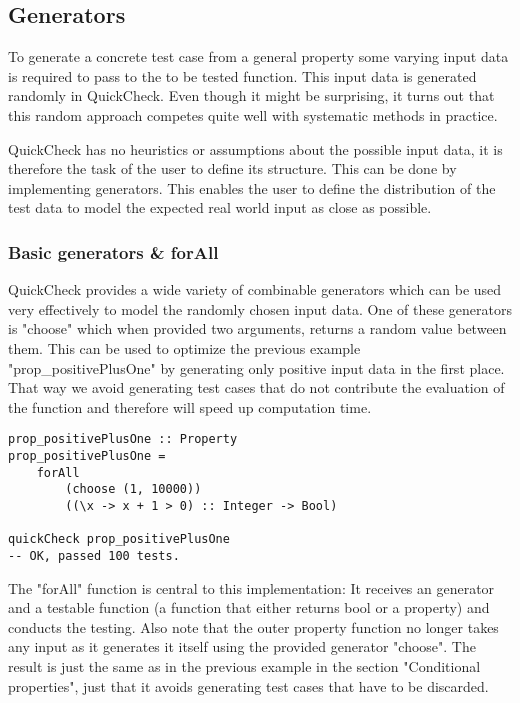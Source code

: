 \documentclass[a4paper, 12pt]{article} %
\begin{document}
\subsection{Generators}

To generate a concrete test case from a general property some varying input data is required to pass to the to be tested function. This input data is generated randomly in QuickCheck. Even though it might be surprising, it turns out that this random approach competes quite well with systematic methods in practice. \cite{Claessen2000}

QuickCheck has no heuristics or assumptions about the possible input data, it is therefore the task of the user to define its structure. This can be done by implementing generators. This enables the user to define the distribution of the test data to model the expected real world input as close as possible.


\subsubsection{Basic generators \& forAll}

QuickCheck provides a wide variety of combinable generators which can be used very effectively to model the randomly chosen input data. One of these generators is "choose" which when provided two arguments, returns a random value between them. This can be used to optimize the previous example "prop\_positivePlusOne" by generating only positive input data in the first place. That way we avoid generating test cases that do not contribute the evaluation of the function and therefore will speed up computation time. 

\begin{verbatim}
prop_positivePlusOne :: Property
prop_positivePlusOne = 
    forAll
        (choose (1, 10000))
        ((\x -> x + 1 > 0) :: Integer -> Bool)

quickCheck prop_positivePlusOne
-- OK, passed 100 tests.
\end{verbatim}

The "forAll" function is central to this implementation: It receives an generator and a testable function (a function that either returns bool or a property) and conducts the testing. Also note that the outer property function no longer takes any input as it generates it itself using the provided generator "choose". The result is just the same as in the previous example in the section "Conditional properties", just that it avoids generating test cases that have to be discarded.
\end{document}
